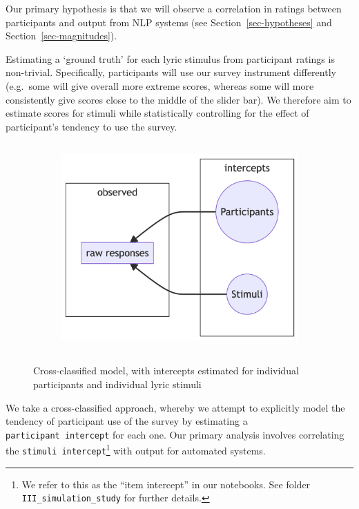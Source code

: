 \documentclass[
  letterpaper,
  DIV=11,
  numbers=noendperiod]{scrartcl}
\begin{document}
Our primary hypothesis is that we will observe a correlation in ratings
between participants and output from NLP systems (see
Section~\ref{sec-hypotheses} and Section~\ref{sec-magnitudes}).

Estimating a `ground truth' for each lyric stimulus from participant
ratings is non-trivial. Specifically, participants will use our survey
instrument differently (e.g.~some will give overall more extreme scores,
whereas some will more consistently give scores close to the middle of
the slider bar). We therefore aim to estimate scores for stimuli while
statistically controlling for the effect of participant's tendency to
use the survey.

\begin{figure}

{\centering 

\begin{figure}[H]

{\centering \includegraphics[width=3.98in,height=3.14in]{pre-registration_pdf_files/figure-latex/mermaid-figure-1.png}

}

\end{figure}

}

\caption{\label{fig-4}Cross-classified model, with intercepts estimated
for individual participants and individual lyric stimuli}

\end{figure}

We take a cross-classified approach, whereby we attempt to explicitly
model the tendency of participant use of the survey by estimating a
\texttt{participant\ intercept} for each one. Our primary analysis
involves correlating the \texttt{stimuli\ intercept}\footnote{We refer
  to this as the ``item intercept'' in our notebooks. See folder
  \texttt{III\_simulation\_study} for further details.} with output for
automated systems.
\end{document}
